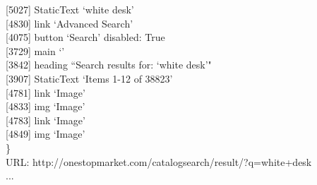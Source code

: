 \begin{tcolorbox}[breakable,title=Prompt Details for WebArena ]
\textnormal{\hspace*{5mm}\hspace*{5mm}[5027] StaticText `white desk'}\\
\textnormal{\hspace*{5mm}[4830] link `Advanced Search'}\\
\textnormal{\hspace*{5mm}[4075] button `Search' disabled: True}\\
\textnormal{\hspace*{5mm}[3729] main `'}\\
\textnormal{\hspace*{5mm}\hspace*{5mm}[3842] heading ``Search results for: `white desk'"}\\
\textnormal{\hspace*{5mm}\hspace*{5mm}[3907] StaticText `Items 1-12 of 38823'}\\
\textnormal{\hspace*{5mm}\hspace*{5mm}[4781] link `Image'}\\
\textnormal{\hspace*{5mm}\hspace*{5mm}\hspace*{5mm}[4833] img `Image'}\\
\textnormal{\hspace*{5mm}\hspace*{5mm}[4783] link `Image'}\\
\textnormal{\hspace*{5mm}\hspace*{5mm}\hspace*{5mm}[4849] img `Image'}\\
\textnormal{\}}\\
\textnormal{URL: http://onestopmarket.com/catalogsearch/result/?q=white+desk}\\
...

\end{tcolorbox}

